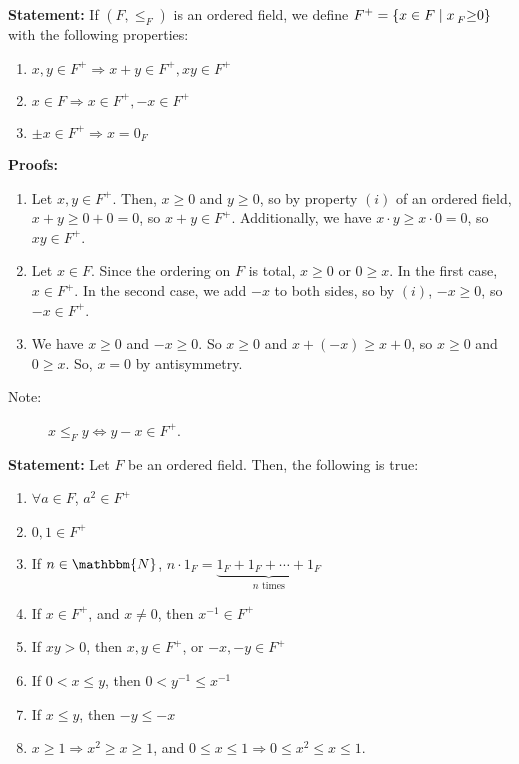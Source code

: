 \documentclass[10pt]{extarticle}
\newcommand{\N}{\mathbbm{N}}
\begin{document}
    \textbf{Statement:} If $(F,\leq_F)$ is an ordered field, we define $F^+ = \{x\in F\mid x\prescript{}{F}\geq 0\}$ with the following properties:
    \begin{enumerate}[(1)]
      \item $x,y\in F^+ \Rightarrow x+y\in F^+,xy\in F^+$
      \item $x\in F \Rightarrow x\in F^+,-x\in F^+$
      \item $\pm x\in F^+ \Rightarrow x = 0_F$
    \end{enumerate}
    \textbf{Proofs:}
      \begin{enumerate}[(1)]
        \item Let $x,y\in F^+$. Then, $x\geq 0$  and $y\geq 0$, so by property $(i)$ of an ordered field, $x+y\geq 0+0 = 0$, so $x+y\in F^+$. Additionally, we have $x\cdot y \geq x\cdot 0 = 0$, so $xy \in F^+$.
        \item Let $x\in F$. Since the ordering on $F$ is total, $x \geq 0$ or $0\geq x$. In the first case, $x\in F^+$. In the second case, we add $-x$ to both sides, so by $(i)$, $-x\geq 0$, so $-x\in F^+$.
        \item We have $x\geq 0$  and $-x\geq 0$. So $x \geq 0$ and $x + (-x) \geq x+0$, so $x\geq 0$ and $0\geq x$. So, $x = 0$ by antisymmetry.
      \end{enumerate}
    \begin{description}
      \item[Note:] $x\leq_F y \Leftrightarrow y-x\in F^+$.
    \end{description}
    \textbf{Statement:} Let $F$ be an ordered field. Then, the following is true:
    \begin{enumerate}[(1)]
      \item $\forall a\in F$, $a^{2}\in F^+$
      \item $0,1\in F^+$
      \item If $n\in \N$, $n\cdot 1_{F} = \underbrace{1_F + 1_F + \cdots + 1_F}_{\text{$n$ times}}$
      \item If $x\in F^+$, and $x\neq 0$, then $x^{-1}\in F^+$
      \item If $xy > 0$, then $x,y\in F^+$, or $-x,-y\in F^{+}$
      \item If $0 < x \leq y$, then $0 < y^{-1} \leq x^{-1}$
      \item If $x\leq y$, then $-y\leq -x$
      \item $x\geq 1 \Rightarrow x^2 \geq x \geq 1$, and $0\leq x\leq 1 \Rightarrow 0 \leq x^2 \leq x \leq 1$.
    \end{enumerate}
\end{document}
